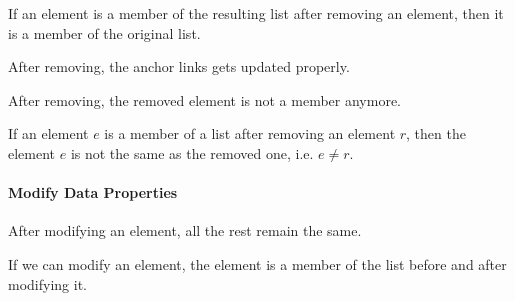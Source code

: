 \begin{theorem}
  \label{thm:MUList.Properties.Removes_members_is_mem}
  \leanok
  If an element is a member of the resulting list after removing an element,
then it is a member of the original list.
  \end{theorem} 

\begin{theorem}
  \label{thm:MUList.Properties.Removes_members_anch}
  \leanok
  After removing, the anchor links gets updated properly.
  \end{theorem} 

\begin{theorem}
  \label{thm:MUList.Properties.Remove_removes}
  \leanok
  After removing, the removed element is not a member anymore.
  \end{theorem} 

\begin{theorem}
  \label{thm:MUList.Properties.Removes_get_not_removed}
  \leanok
  If an element \(e\) is a member of a list after removing an element \(r\), then the
element \(e\) is not the same as the removed one, i.e. \(e \neq r\).
  \end{theorem} 

\paragraph*{Modify Data Properties}

\begin{theorem}
  \label{thm:MUList.Properties.ModifyData_same_others}
  \leanok
  After modifying an element, all the rest remain the same.
  \end{theorem} 

\begin{theorem}
  \label{thm:MUList.Properties.ModifyData_find_token}
  \leanok
  If we can modify an element, the element is a member of the list before and
after modifying it.
  \end{theorem} 

